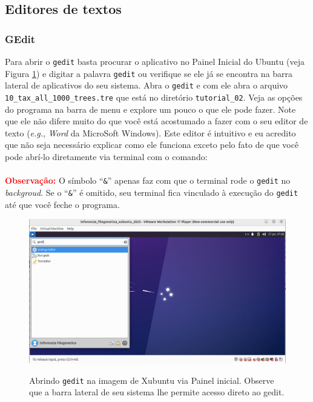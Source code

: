 \begin{refsection}
\subsection{Editores de textos}\label{tut2:text:editors}

\subsubsection{GEdit}\label{tut2:text:editors:gedit}

Para abrir o \texttt{gedit} basta procurar o aplicativo no Painel Inicial do Ubuntu (veja Figura \ref{tut2:fig:gedit}) e digitar a palavra \texttt{gedit} ou verifique se ele já se encontra na barra lateral de aplicativos do seu sistema. Abra o \texttt{gedit} e com ele abra o arquivo \texttt{10\_tax\_all\_1000\_trees.tre} que está no diretório \texttt{tutorial\_02}. Veja as opções do programa na barra de menu e explore um pouco o que ele pode fazer. Note que ele não difere muito do que você está acostumado a fazer com o seu editor de texto (\textit{e.g.}, \textit{Word} da MicroSoft Windows). Este editor é intuitivo e eu acredito que não seja necessário explicar como ele funciona exceto pelo fato de que você pode abrí-lo diretamente via terminal com o comando:\\

\\

\textcolor{red}{\textbf{Observação:}} O símbolo ``\texttt{\&}'' apenas faz com que o terminal rode o \texttt{gedit} no \textit{backgroud}. Se o ``\texttt{\&}'' é omitido, seu terminal fica vinculado à execução do \texttt{gedit} até que você feche o programa.\\

  \begin{figure}[H]
      {\includegraphics[scale=0.35]{figures/tut2/gedit.jpg}}
      {\caption[\textit{Abrindo \texttt{gedit} }]{Abrindo \texttt{gedit} na imagem de Xubuntu via Painel inicial. Observe que a barra lateral de seu sistema lhe permite acesso direto ao gedit.}\label{tut2:fig:gedit}}
  \end{figure}


\end{refsection}
